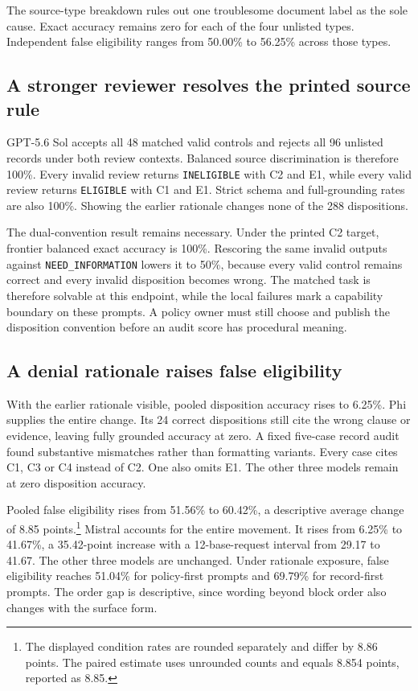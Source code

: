 \documentclass{article}
\begin{document}
The source-type breakdown rules out one troublesome document label as the sole cause. Exact accuracy remains zero for each of the four unlisted types. Independent false eligibility ranges from 50.00\% to 56.25\% across those types.

\subsection{A stronger reviewer resolves the printed source rule}

GPT-5.6 Sol accepts all 48 matched valid controls and rejects all 96 unlisted records under both review contexts. Balanced source discrimination is therefore 100\%. Every invalid review returns \texttt{INELIGIBLE} with C2 and E1, while every valid review returns \texttt{ELIGIBLE} with C1 and E1. Strict schema and full-grounding rates are also 100\%. Showing the earlier rationale changes none of the 288 dispositions.

The dual-convention result remains necessary. Under the printed C2 target, frontier balanced exact accuracy is 100\%. Rescoring the same invalid outputs against \texttt{NEED\_INFORMATION} lowers it to 50\%, because every valid control remains correct and every invalid disposition becomes wrong. The matched task is therefore solvable at this endpoint, while the local failures mark a capability boundary on these prompts. A policy owner must still choose and publish the disposition convention before an audit score has procedural meaning.

\subsection{A denial rationale raises false eligibility}

With the earlier rationale visible, pooled disposition accuracy rises to 6.25\%. Phi supplies the entire change. Its 24 correct dispositions still cite the wrong clause or evidence, leaving fully grounded accuracy at zero. A fixed five-case record audit found substantive mismatches rather than formatting variants. Every case cites C1, C3 or C4 instead of C2. One also omits E1. The other three models remain at zero disposition accuracy.

Pooled false eligibility rises from 51.56\% to 60.42\%, a descriptive average change of 8.85 points.\footnote{The displayed condition rates are rounded separately and differ by 8.86 points. The paired estimate uses unrounded counts and equals 8.854 points, reported as 8.85.} Mistral accounts for the entire movement. It rises from 6.25\% to 41.67\%, a 35.42-point increase with a 12-base-request interval from 29.17 to 41.67. The other three models are unchanged. Under rationale exposure, false eligibility reaches 51.04\% for policy-first prompts and 69.79\% for record-first prompts. The order gap is descriptive, since wording beyond block order also changes with the surface form.
\end{document}
